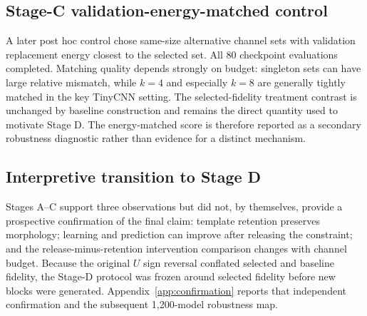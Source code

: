 \subsection{Stage-C validation-energy-matched control}\label{app:stage-c-energy}

A later post hoc control chose same-size alternative channel sets with validation replacement energy closest to the selected set. All 80 checkpoint evaluations completed. Matching quality depends strongly on budget: singleton sets can have large relative mismatch, while $k=4$ and especially $k=8$ are generally tightly matched in the key TinyCNN setting. The selected-fidelity treatment contrast is unchanged by baseline construction and remains the direct quantity used to motivate Stage D. The energy-matched score is therefore reported as a secondary robustness diagnostic rather than evidence for a distinct mechanism.

\subsection{Interpretive transition to Stage D}\label{app:transition}

Stages A--C support three observations but did not, by themselves, provide a prospective confirmation of the final claim: template retention preserves morphology; learning and prediction can improve after releasing the constraint; and the release-minus-retention intervention comparison changes with channel budget. Because the original $U$ sign reversal conflated selected and baseline fidelity, the Stage-D protocol was frozen around selected fidelity before new blocks were generated. Appendix~\ref{app:confirmation} reports that independent confirmation and the subsequent 1,200-model robustness map.
